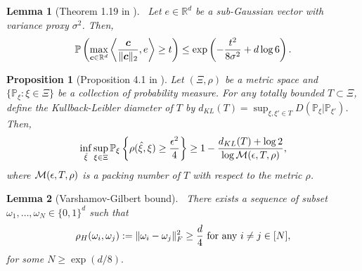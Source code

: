 \documentclass[11pt]{article}
\newtheorem{lem}{Lemma}
\newtheorem{prop}{Proposition}
\theoremstyle{definition}
\begin{document}
\begin{lem}[Theorem 1.19 in \citet{phillippek2016}]~\label{lem:subga} Let $e\in\mathbb{R}^d$ be a sub-Gaussian vector with variance proxy $\sigma^2$. Then, 
\begin{align}
    \mathbb{P}\left(\max_{\bm{c}\in\mathbb{R}^d}\left\langle \frac{\bm{c}}{\|\bm{c}\|_2}, e\right\rangle\geq t\right)\leq \exp\left(-\frac{t^2}{8\sigma^2}+d\log 6\right).
\end{align}

\end{lem}

\begin{prop}[Proposition 4.1 in \citet{gao2015rate}]\label{prop:minmax}
Let $(\Xi,\rho)$ be a metric space and $\{\mathbb{P}_\xi\colon\xi\in\Xi\}$ be a collection of probability measure. For any totally bounded $T\subset\Xi$, define the Kullback-Leibler diameter of $T$ by $d_{KL}(T) = \sup_{\xi,\xi'\in T}D(\mathbb{P}_{\xi}|\mathbb{P}_{\xi'})$. Then,
\begin{align}
    \inf_{\hat\xi}\sup_{\xi\in\Xi}\mathbb{P}_\xi\left\{\rho(\hat\xi,\xi)\geq \frac{\epsilon^2}{4}\right\}\geq 1-\frac{d_{KL}(T)+\log 2}{\log \mathcal{M}(\epsilon,T,\rho)},
\end{align}
where $\mathcal{M}(\epsilon,T,\rho)$ is a packing number of $T$ with  respect to the metric $\rho$.
\end{prop}



\begin{lem}[Varshamov-Gilbert bound]~\label{lem:covering} There exists a sequence of subset $\omega_1,\ldots,\omega_N\in\{0,1\}^d$ such that 
\begin{align}
    \rho_H(\omega_i,\omega_j):= \lVert\omega_i-\omega_j\rVert_F^2 \geq \frac{d}{4} \text{ for any } i\neq j\in[N],
\end{align}
for some $N\geq \exp(d/8).$
\end{lem}
\end{document}
